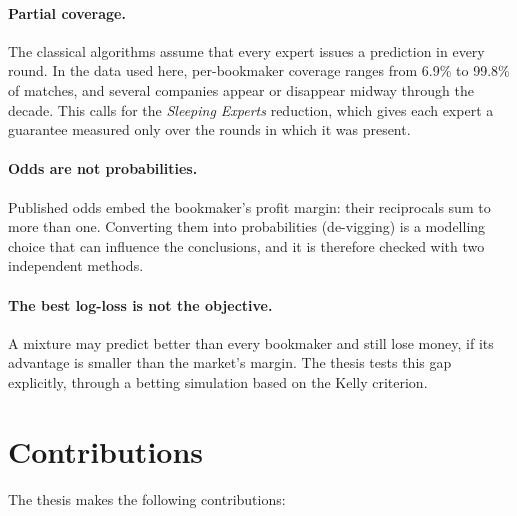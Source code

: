 \documentclass[12pt,a4paper,oneside]{report}
\renewcommand{\_}{\oldunderscore\allowbreak}
\theoremstyle{definition}
\theoremstyle{plain}
\theoremstyle{definition}   %
\begin{document}
\paragraph{Partial coverage.} The classical algorithms assume that every expert issues a
prediction in every round. In the data used here, per-bookmaker coverage ranges from 6.9\% to
99.8\% of matches, and several companies appear or disappear midway through the decade. This
calls for the \emph{Sleeping Experts} reduction, which gives each expert a guarantee measured
only over the rounds in which it was present.

\paragraph{Odds are not probabilities.} Published odds embed the bookmaker's profit margin:
their reciprocals sum to more than one. Converting them into probabilities (de-vigging) is a
modelling choice that can influence the conclusions, and it is therefore checked with two
independent methods.

\paragraph{The best log-loss is not the objective.} A mixture may predict better than every
bookmaker and still lose money, if its advantage is smaller than the market's margin. The
thesis tests this gap explicitly, through a betting simulation based on the Kelly criterion.

\section{Contributions}

The thesis makes the following contributions:
\end{document}

